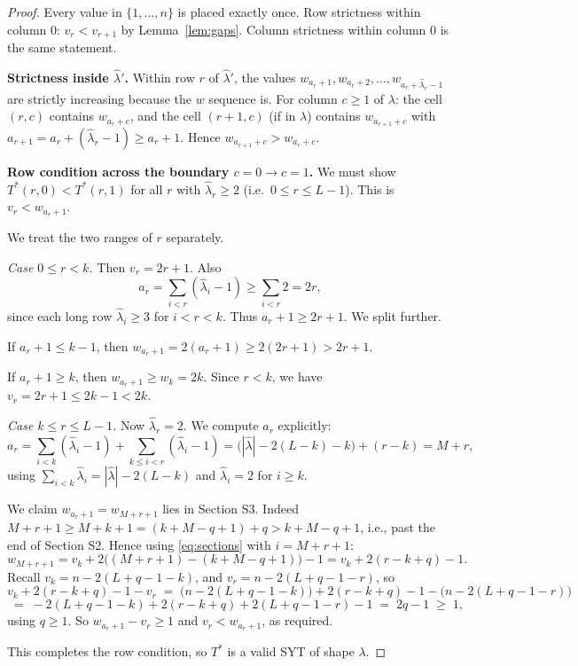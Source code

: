 \documentclass[11pt]{article}
\theoremstyle{definition}
\newcommand{\hatl}{\widehat\lambda}
\begin{document}
\begin{proof}
Every value in $\{1, \ldots, n\}$ is placed exactly once.  Row
strictness within column $0$: $v_r < v_{r+1}$ by
Lemma~\ref{lem:gaps}.  Column strictness within column $0$ is the
same statement.

\textbf{Strictness inside $\hatl'$.}  Within row $r$ of $\hatl'$, the
values $w_{a_r+1}, w_{a_r+2}, \ldots, w_{a_r + \hatl_r - 1}$ are
strictly increasing because the $w$ sequence is.  For column $c \ge
1$ of $\lambda$: the cell $(r, c)$ contains $w_{a_r + c}$, and the
cell $(r+1, c)$ (if in $\lambda$) contains $w_{a_{r+1} + c}$ with
$a_{r+1} = a_r + (\hatl_r - 1) \ge a_r + 1$.  Hence $w_{a_{r+1}+c} >
w_{a_r + c}$.

\textbf{Row condition across the boundary $c = 0 \to c = 1$.}  We
must show $T^*(r, 0) < T^*(r, 1)$ for all $r$ with $\hatl_r \ge 2$
(i.e.\ $0 \le r \le L-1$).  This is $v_r < w_{a_r + 1}$.

We treat the two ranges of $r$ separately.

\emph{Case $0 \le r < k$.}  Then $v_r = 2r+1$.  Also
\[
   a_r = \sum_{i < r}(\hatl_i - 1) \ge \sum_{i < r} 2 = 2r,
\]
since each long row $\hatl_i \ge 3$ for $i < r < k$.  Thus $a_r + 1
\ge 2r + 1$.  We split further.

If $a_r + 1 \le k - 1$, then $w_{a_r+1} = 2(a_r+1) \ge 2(2r+1) > 2r+1$.

If $a_r + 1 \ge k$, then $w_{a_r+1} \ge w_k = 2k$.  Since $r < k$,
we have $v_r = 2r + 1 \le 2k - 1 < 2k$.

\emph{Case $k \le r \le L-1$.}  Now $\hatl_r = 2$.  We compute $a_r$
explicitly:
\[
   a_r = \sum_{i < k}(\hatl_i - 1) + \sum_{k \le i < r}(\hatl_i - 1)
       = \bigl(|\hatl| - 2(L-k) - k\bigr) + (r - k)
       = M + r,
\]
using $\sum_{i<k} \hatl_i = |\hatl| - 2(L-k)$ and $\hatl_i = 2$ for
$i \ge k$.

We claim $w_{a_r + 1} = w_{M + r + 1}$ lies in Section S3.  Indeed
$M + r + 1 \ge M + k + 1 = (k + M - q + 1) + q > k + M - q + 1$,
i.e., past the end of Section S2.  Hence using \eqref{eq:sections}
with $i = M + r + 1$:
\[
   w_{M+r+1} = v_k + 2\bigl((M+r+1) - (k+M-q+1)\bigr) - 1
            = v_k + 2(r - k + q) - 1.
\]
Recall $v_k = n - 2(L+q-1-k)$, and $v_r = n - 2(L+q-1-r)$, so
\[
   v_k + 2(r - k + q) - 1 - v_r
   \;=\; \bigl(n - 2(L+q-1-k)\bigr) + 2(r-k+q) - 1 - \bigl(n - 2(L+q-1-r)\bigr)
\]
\[
   \;=\; -2(L+q-1-k) + 2(r-k+q) + 2(L+q-1-r) - 1
   \;=\; 2q - 1 \;\ge\; 1,
\]
using $q \ge 1$.  So $w_{a_r+1} - v_r \ge 1$ and $v_r < w_{a_r+1}$,
as required.

This completes the row condition, so $T^*$ is a valid SYT of shape
$\lambda$.
\end{proof}
\end{document}
